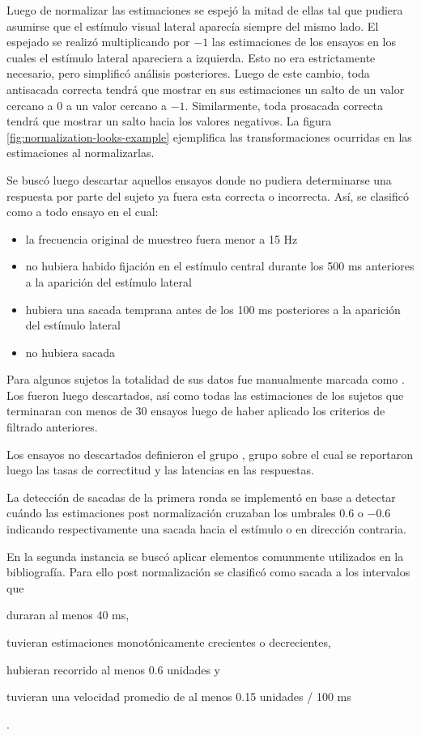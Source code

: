   Luego de normalizar las estimaciones se espejó la mitad de ellas tal que
  pudiera asumirse que el estímulo visual lateral aparecía siempre del mismo
  lado.
  El espejado se realizó multiplicando por $-1$ las estimaciones de los ensayos
  en los cuales el estímulo lateral apareciera a izquierda.
  Esto no era estrictamente necesario, pero simplificó análisis posteriores.
  Luego de este cambio, toda antisacada correcta tendrá que mostrar en sus
  estimaciones un salto de un valor cercano a $0$ a un valor cercano a $-1$.
  Similarmente, toda prosacada correcta tendrá que mostrar un salto hacia los
  valores negativos.
  La figura \ref{fig:normalization-looks-example} ejemplifica las
  transformaciones ocurridas en las estimaciones al normalizarlas.

  Se buscó luego descartar aquellos ensayos donde no pudiera determinarse una
  respuesta por parte del sujeto ya fuera esta correcta o incorrecta.
  Así, se clasificó como \outlier a todo ensayo en el cual:
  \begin{itemize}
    \item la frecuencia original de muestreo fuera menor a 15 Hz
    \item no hubiera habido fijación en el estímulo central durante los 500 ms
      anteriores a la aparición del estímulo lateral
    \item hubiera una sacada temprana antes de los 100 ms posteriores a la
      aparición del estímulo lateral
    \item no hubiera sacada
  \end{itemize}
  Para algunos sujetos la totalidad de sus datos fue manualmente marcada como
  \outlier.
  Los \outliers fueron luego descartados, así como todas las estimaciones de
  los sujetos que terminaran con menos de 30 ensayos luego de haber aplicado
  los criterios de filtrado anteriores.

  Los ensayos no descartados definieron el grupo \inlier, grupo sobre el cual
  se reportaron luego las tasas de correctitud y las latencias en las
  respuestas.

  La detección de sacadas de la primera ronda se implementó en base a detectar
  cuándo las estimaciones post normalización cruzaban los umbrales $0.6$ o
  $-0.6$ indicando respectivamente una sacada hacia el estímulo o en dirección
  contraria.

  En la segunda instancia se buscó aplicar elementos comunmente utilizados en
  la bibliografía.
  Para ello post normalización se clasificó como sacada a los intervalos que
  \begin{enumerate*}
    \item duraran al menos 40 ms,
    \item tuvieran estimaciones monotónicamente crecientes o decrecientes,
    \item hubieran recorrido al menos 0.6 unidades y
    \item tuvieran una velocidad promedio de al menos 0.15 unidades / 100 ms
  \end{enumerate*}.
  \label{section:saccades-detection}
